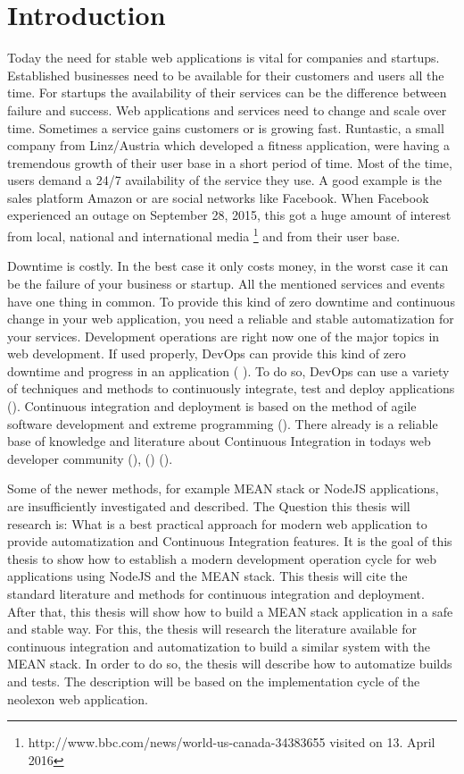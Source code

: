 \section{Introduction}
Today the need for stable web applications is vital for companies and startups. Established businesses need to be
available for their customers and users all the time. For startups the availability of their services can be the difference
between failure and success. Web applications and services need to change and scale over time. Sometimes a service gains customers or is
growing fast. Runtastic, a small company from Linz/Austria which developed a fitness application, were having a tremendous growth of
their user base in a short period of time. Most of the time, users demand a 24/7 availability of the service they use. A good example
is the sales platform Amazon or are social networks like Facebook. When Facebook experienced an outage on September 28, 2015, this 
got a huge amount of interest from local, national and international media \footnote{http://www.bbc.com/news/world-us-canada-34383655 visited on 13. April 2016} and from their user base.

Downtime is costly. In the best case it only costs money, in the worst case
it can be the failure of your business or startup. All the mentioned services and events have one thing in common. To provide this kind of zero
downtime and continuous change in your web application, you need a reliable and stable automatization for your services. Development operations are
right now one of the major topics in web development. If used properly, DevOps can provide this kind of zero downtime and progress in an application
(\cite{humble2010continuous} \cite{duvall2007continuous}). To do so, DevOps can use a variety of techniques and methods to continuously
integrate, test and deploy applications (\cite{meyer2014continuous}).
Continuous integration and deployment is based on the method of agile software development and extreme programming
(\cite{lindstrom2004extreme}). There already is a reliable base of knowledge and literature about Continuous Integration in todays web developer community
(\cite{schaefer2013continuous}), (\cite{fowler2006continuous}) (\cite{fowler2012continuous}).

Some of the newer methods, for example MEAN stack or NodeJS applications, are insufficiently investigated and described.
The Question this thesis will research is: What is a best practical approach for modern web application 
to provide automatization and Continuous Integration features. It is the goal of this thesis to show how to establish a modern development operation
cycle for web applications using NodeJS and the MEAN stack.
This thesis will cite the standard literature and methods for continuous integration and deployment. After that, this thesis will
show how to build a MEAN stack application in a safe and stable way.
For this, the thesis will research the literature available for continuous integration and automatization to build a similar system with the MEAN stack.
In order to do so, the thesis will describe how to automatize builds and tests. The description will be based on the implementation cycle of the neolexon web application.

